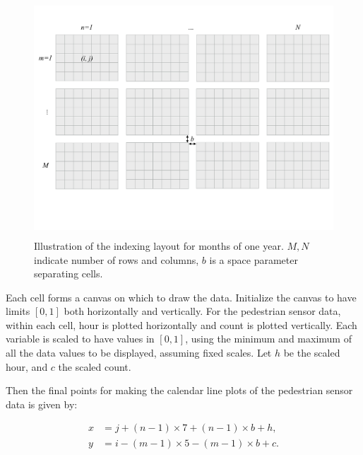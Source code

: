 \documentclass[article]{jss}
\theoremstyle{definition}
\theoremstyle{definition}
\theoremstyle{remark}
\begin{document}
\begin{CodeChunk}
\begin{figure}

{\centering \includegraphics[width=360pt,height=250pt]{figure/year-diagram} 

}

\caption[Illustration of the indexing layout for months of
one year. \(M,N\) indicate number of rows and columns, \(b\) is a space
parameter separating cells.]{Illustration of the indexing layout for months of
one year. \(M,N\) indicate number of rows and columns, \(b\) is a space
parameter separating cells.}\label{fig:year-diagram}
\end{figure}
\end{CodeChunk}





Each cell forms a canvas on which to draw the data. Initialize the
canvas to have limits \([0, 1]\) both horizontally and vertically. For
the pedestrian sensor data, within each cell, hour is plotted
horizontally and count is plotted vertically. Each variable is scaled to
have values in \([0,1]\), using the minimum and maximum of all the data
values to be displayed, assuming fixed scales. Let \(h\) be the scaled
hour, and \(c\) the scaled count.

Then the final points for making the calendar line plots of the
pedestrian sensor data is given by:

\begin{equation}
  \begin{aligned}
  x &= j + (n - 1) \times 7 + (n - 1) \times b + h, \\
  y &= i - (m - 1) \times 5 - (m - 1) \times b + c. \label{eq:final}
  \end{aligned}
\end{equation}
\end{document}
